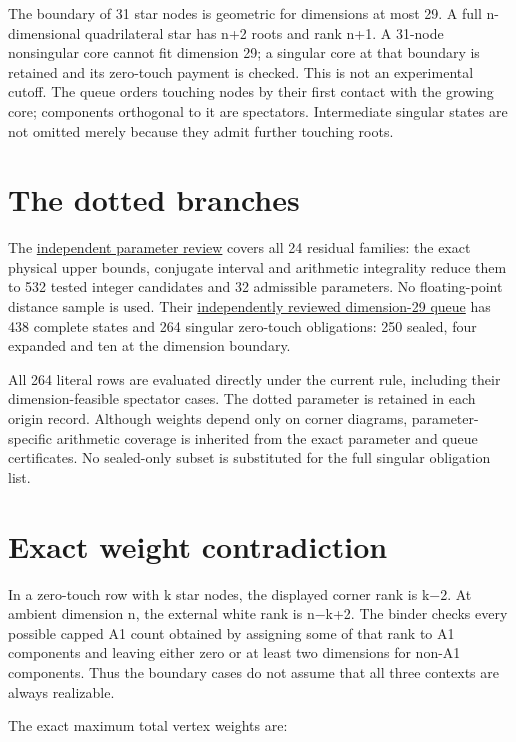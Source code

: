 \documentclass[
  10pt,
]{report}
\begin{document}
The boundary of 31 star nodes is geometric for dimensions at most 29. A
full n-dimensional quadrilateral star has n+2 roots and rank n+1. A
31-node nonsingular core cannot fit dimension 29; a singular core at
that boundary is retained and its zero-touch payment is checked. This is
not an experimental cutoff. The queue orders touching nodes by their
first contact with the growing core; components orthogonal to it are
spectators. Intermediate singular states are not omitted merely because
they admit further touching roots.

\section{The dotted branches}\label{the-dotted-branches}

The \href{fresh_sqrt5_dotted_parameters_20261015_review.md}{independent
parameter review} covers all 24 residual families: the exact physical
upper bounds, conjugate interval and arithmetic integrality reduce them
to 532 tested integer candidates and 32 admissible parameters. No
floating-point distance sample is used. Their
\href{fresh_sqrt5_dotted_rank29_exhaustion_20261015_review.md}{independently
reviewed dimension-29 queue} has 438 complete states and 264 singular
zero-touch obligations: 250 sealed, four expanded and ten at the
dimension boundary.

All 264 literal rows are evaluated directly under the current rule,
including their dimension-feasible spectator cases. The dotted parameter
is retained in each origin record. Although weights depend only on
corner diagrams, parameter-specific arithmetic coverage is inherited
from the exact parameter and queue certificates. No sealed-only subset
is substituted for the full singular obligation list.

\section{Exact weight contradiction}\label{exact-weight-contradiction}

In a zero-touch row with k star nodes, the displayed corner rank is k−2.
At ambient dimension n, the external white rank is n−k+2. The binder
checks every possible capped A1 count obtained by assigning some of that
rank to A1 components and leaving either zero or at least two dimensions
for non-A1 components. Thus the boundary cases do not assume that all
three contexts are always realizable.

The exact maximum total vertex weights are:
\end{document}
